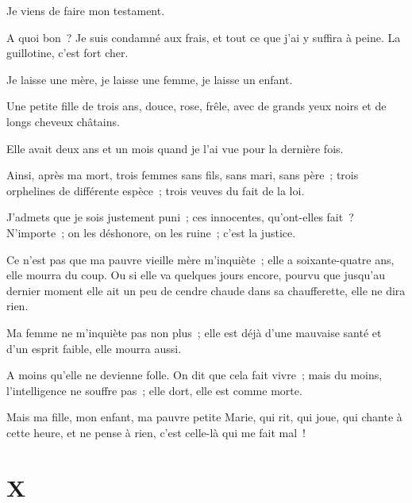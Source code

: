 \documentclass[french,twoside]{book} %
\begin{document}
\noindent Je viens de faire mon testament.\par
A quoi bon ? Je suis condamné aux frais, et tout ce que j’ai y suffira à peine. La guillotine, c’est fort cher.\par
Je laisse une mère, je laisse une femme, je laisse un enfant.\par
Une petite fille de trois ans, douce, rose, frêle, avec de grands yeux noirs et de longs cheveux châtains.\par
Elle avait deux ans et un mois quand je l’ai vue pour la dernière fois.\par
Ainsi, après ma mort, trois femmes sans fils, sans mari, sans père ; trois orphelines de différente espèce ; trois veuves du fait de la loi.\par
J’admets que je sois justement puni ; ces innocentes, qu’ont-elles fait ? N’importe ; on les déshonore, on les ruine ; c’est la justice.\par
Ce n’est pas que ma pauvre vieille mère m’inquiète ; elle a soixante-quatre ans, elle mourra du coup. Ou  si elle va quelques jours encore, pourvu que jusqu’au dernier moment elle ait un peu de cendre chaude dans sa chaufferette, elle ne dira rien.\par
Ma femme ne m’inquiète pas non plus ; elle est déjà d’une mauvaise santé et d’un esprit faible, elle mourra aussi.\par
A moins qu’elle ne devienne folle. On dit que cela fait vivre ; mais du moins, l’intelligence ne souffre pas ; elle dort, elle est comme morte.\par
Mais ma fille, mon enfant, ma pauvre petite Marie, qui rit, qui joue, qui chante à cette heure, et ne pense à rien, c’est celle-là qui me fait mal !
 \section[{X}]{X}
\label{ch10}\renewcommand{\leftmark}{X}
\end{document}
